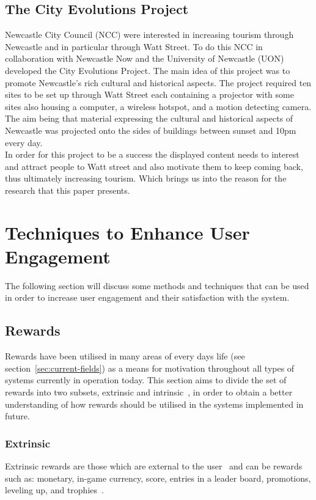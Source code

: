 \documentclass[a4paper,12pt]{article}
\begin{document}
\subsection{The City Evolutions Project}\label{sec:city-evolutions-project}
Newcastle City Council (NCC) were interested in increasing tourism through Newcastle and in particular through Watt Street. To do this NCC in collaboration with Newcastle Now and the University of Newcastle (UON) developed the City Evolutions Project. The main idea of this project was to promote Newcastle's rich cultural and historical aspects. 
The project required ten sites to be set up through Watt Street each containing a projector with some sites also housing a computer, a wireless hotspot, and a motion detecting camera. The aim being that material expressing the cultural and historical aspects of Newcastle was projected onto the sides of buildings between sunset and 10pm every day.\\
In order for this project to be a success the displayed content needs to interest and attract people to Watt street and also motivate them to keep coming back, thus ultimately increasing tourism. Which brings us into the reason for the research that this paper presents.


\section{Techniques to Enhance User Engagement}\label{sec:techniques-to-enhance}
The following section will discuss some methods and techniques that can be used in order to increase user engagement and their satisfaction with the system.

\subsection{Rewards}\label{sec:rewards}
Rewards have been utilised in many areas of every days life (see section~\ref{sec:current-fields}) as a means for motivation throughout all types of systems currently in operation today.
This section aims to divide the set of rewards into two subsets, extrinsic and intrinsic~\citep{bread-and-games,fun-of-use,deci_extrinsic_2001,McGonigal:2011:RBW:1972527}, in order to obtain a better understanding of how rewards should be utilised in the systems implemented in future.

\subsubsection{Extrinsic}\label{sec:extrinsic}
Extrinsic rewards are those which are external to the user~\citep{deci_extrinsic_2001,McGonigal:2011:RBW:1972527} and can be rewards such as: monetary,	in-game currency, score, entries in a leader board, promotions, leveling up, and trophies~\citep{bread-and-games}.
\end{document}
